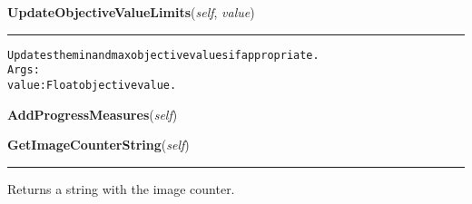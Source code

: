     \vspace{0.5ex}

\hspace{.8\funcindent}\begin{boxedminipage}{\funcwidth}

    \raggedright \textbf{UpdateObjectiveValueLimits}(\textit{self}, \textit{value})

    \vspace{-1.5ex}

    \rule{\textwidth}{0.5\fboxrule}
\setlength{\parskip}{2ex}
\begin{alltt}
Updates the min and max objective values if appropriate.
Args:
  value: Float objective value.
\end{alltt}

\setlength{\parskip}{1ex}
    \end{boxedminipage}

    \label{coinor:grumpy:BB:BBTree:AddProgressMeasures}

    \vspace{0.5ex}

\hspace{.8\funcindent}\begin{boxedminipage}{\funcwidth}

    \raggedright \textbf{AddProgressMeasures}(\textit{self})

\setlength{\parskip}{2ex}
\setlength{\parskip}{1ex}
    \end{boxedminipage}

    \label{coinor:grumpy:BB:BBTree:GetImageCounterString}

    \vspace{0.5ex}

\hspace{.8\funcindent}\begin{boxedminipage}{\funcwidth}

    \raggedright \textbf{GetImageCounterString}(\textit{self})

    \vspace{-1.5ex}

    \rule{\textwidth}{0.5\fboxrule}
\setlength{\parskip}{2ex}
    Returns a string with the image counter.

\setlength{\parskip}{1ex}
    \end{boxedminipage}

